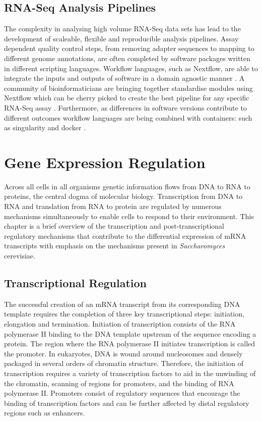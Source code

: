 \documentclass[../main.tex]{subfiles}
\begin{document}
\subsection{RNA-Seq Analysis Pipelines}

The complexity in analysing high volume RNA-Seq data sets has lead to the development of scaleable, flexible and reproducible analysis pipelines.
Assay dependent quality control steps, from removing adapter sequences to mapping to different genome annotations, are often completed by software packages written in different scripting languages.
Workflow languages, such as Nextflow, are able to integrate the inputs and outputs of software in a domain agnostic manner \parencite{DiTommaso2017}.
A community of bioinformaticians are bringing together standardise modules using Nextflow which can be cherry picked to create the best pipeline for any specific RNA-Seq assay \parencite{Ewels2020}.
Furthermore, as differences in software versions contribute to different outcomes workflow languages are being combined with containers: such as singularity and docker \parencite{DiTommaso2015}.

\newpage

\section{Gene Expression Regulation}

Across all cells in all organisms genetic information flows from DNA to RNA to proteins, the central dogma of molecular biology.
Transcription from DNA to RNA and translation from RNA to protein are regulated by numerous mechanisms simultaneously to enable cells to respond to their environment.
This chapter is a brief overview of the transcription and post-transcriptional regulatory mechanisms that contribute to the differential expression of mRNA transcripts with emphasis on the mechanisms present in \textit{Saccharomyces} cerevisiae. 

\subsection{Transcriptional Regulation}

The successful creation of an mRNA transcript from its corresponding DNA template requires the completion of three key transcriptional steps: initiation, elongation and termination.
Initiation of transcription consists of the RNA polymerase II binding to the DNA template upstream of the sequence encoding a protein.
The region where the RNA polymerase II initiates transcription is called the promoter.
In eukaryotes, DNA is wound around nucleosomes and densely packaged in several orders of chromatin structure.
Therefore, the initiation of transcription requires a variety of transcription factors to aid in the unwinding of the chromatin, scanning of regions for promoters, and the binding of RNA polymerase II.
Promoters consist of regulatory sequences that encourage the binding of transcription factors and can be further affected by distal regulatory regions such as enhancers. 
\end{document}
